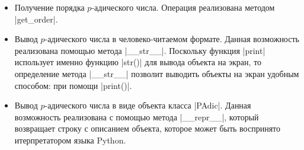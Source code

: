 \documentclass[master, och, diploma, times]{sty/SCWorks}
\theoremstyle{plain}
\theoremstyle{definition}
\begin{document}
\begin{itemize}
\item Получение порядка $p$-адического числа. Операция реализована методом |get_order|.
\item Вывод $p$-адического числа в человеко-читаемом формате. Данная возможность реализована  помощью метода |__str__|. Поскольку функция |print| использует именно функцию |str()| для вывода объекта на экран, то определение метода |__str__| позволит выводить объекты на экран удобным способом: при помощи |print()|.
\item Вывод $p$-адического числа в виде объекта класса |PAdic|. Данная возможность реализована с помощью метода |__repr__|, который возвращает строку с описанием объекта, которое может быть воспринято итерпретатором языка Python.
\end{itemize}
\end{document}
